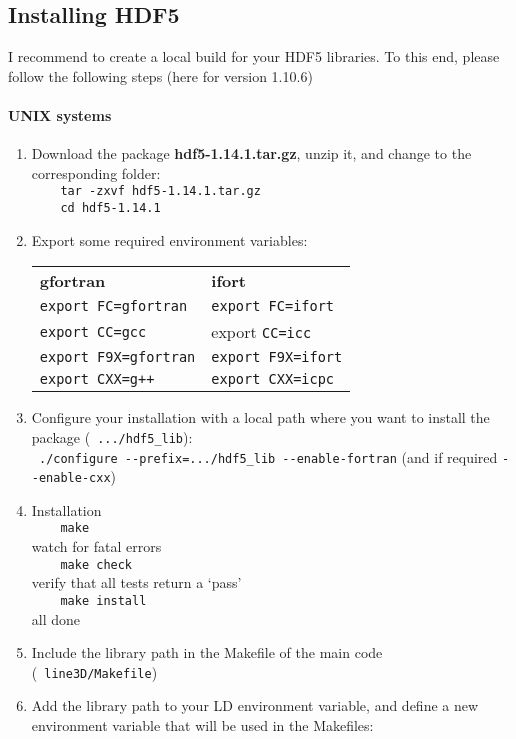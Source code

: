\documentclass[10pt,a4paper]{article}
\begin{document}
\subsection{Installing HDF5}
\label{subsec:hdf5}
I recommend to create a local build for your HDF5 libraries. To this end, please follow the following steps (here for version 1.10.6)
\paragraph{UNIX systems}
\begin{enumerate}
\item Download the package \textbf{hdf5-1.14.1.tar.gz}, unzip it, and change to the corresponding folder: \\
  \verb|    tar -zxvf hdf5-1.14.1.tar.gz|\\
  \verb|    cd hdf5-1.14.1|
\item Export some required environment variables:\\
    \begin{tabular}{ll}
      \textbf{gfortran}  & \textbf{ifort} \\
      \verb|export FC=gfortran| & \verb|export FC=ifort| \\
      \verb|export CC=gcc| & export \verb|CC=icc| \\
      \verb|export F9X=gfortran| & \verb|export F9X=ifort| \\
      \verb|export CXX=g++| & \verb|export CXX=icpc|
    \end{tabular}
\item Configure your installation with a local path where you want to install the package (\eg~\verb|.../hdf5_lib|):\\
  \verb| ./configure --prefix=.../hdf5_lib --enable-fortran| (and if required \verb|--enable-cxx|)
\item Installation \\
  \verb|    make|\\ 
   watch for fatal errors\\
  \verb|    make check|\\
  verify that all tests return a `pass' \\
  \verb|    make install|\\
   all done
\item Include the library path in the Makefile of the main code (\eg~\verb|line3D/Makefile|)
\item Add the library path to your LD environment variable, and define a new environment variable that will be used in the Makefiles:\\

\end{enumerate}
\end{document}
